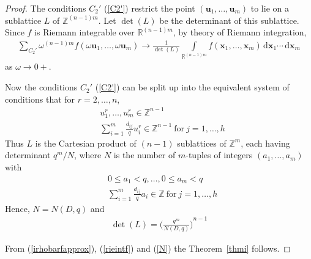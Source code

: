 \documentclass[11pt]{article}
\theoremstyle{definition}
\theoremstyle{proof}
\begin{document}
\begin{proof}
    The conditions $C_2 '$ (\ref{C2'}) restrict the point $(\bm{u}_1, \ldots, \bm{u}_m)$ to lie on a sublattice $L$ of $\mathbb{Z}^{(n-1)m}$.
    Let $\det(L)$ be the determinant of this sublattice.
    Since $f$ is Riemann integrable over $\mathbb{R}^{(n-1)m}$, by theory of Riemann integration,
    \begin{align}\label{rieintf}
        \sum_{C_2 '} \omega ^{(n-1)m} f(\omega \bm{u}_1, \ldots, \omega \bm{u}_m) \to \frac{1}{\det(L)} \int\limits_{\mathbb{R}^{(n-1)m}} f(\bm{x}_1, \ldots, \bm{x}_m) \, \mathrm{d} \bm{x}_1 \cdots \, \mathrm{d} \bm{x}_m
    \end{align}
    as $\omega \to 0+$.

    Now the conditions $C_2 '$ (\ref{C2'}) can be split up into the equivalent system of conditions that for $r= 2, \ldots, n$,
    \begin{equation}\label{C2''}
        \begin{split}
            & u_1^r, \ldots, u_m^r \in \mathbb{Z}^{n-1} \\
            & \displaystyle\sum_{i=1}^{m} \frac{d_{ij}}{q} u_i^r \in \mathbb{Z}^{n-1} \ \text{for} \ j=1, \ldots, h
        \end{split}
    \end{equation}
    Thus $L$ is the Cartesian product of $(n-1)$ sublattices of $\mathbb{Z}^{m}$, each having determinant $q^m/N$, where $N$ is the number of $m$-tuples of integers $(a_1, \ldots, a_m)$ with
    \begin{align*}
        & 0 \leq a_1 < q, \ldots, 0 \leq  a_m < q \\
        & \sum_{i=1}^{m} \frac{d_{ij}}{q} a_i \in \mathbb{Z} \ \text{for} \ j=1, \ldots, h
    \end{align*}
    Hence, $N = N(D, q)$ and
    \begin{align}\label{N}
        \displaystyle\det (L) = {\bigg(\frac{q^m}{N(D, q)} \bigg)}^{n-1}
    \end{align}

    From (\ref{irhobarfapprox}), (\ref{rieintf}) and (\ref{N}) the Theorem~\ref{thmi} follows.

\end{proof}
\end{document}
